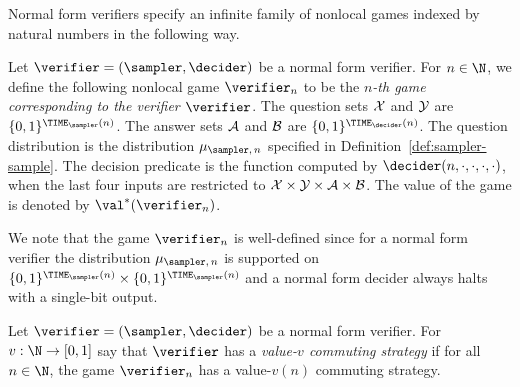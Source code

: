 Normal form verifiers specify an infinite family of nonlocal games indexed by
natural numbers in the following way.

\begin{definition}
  \label{def:normal-game}
  Let $\verifier = (\sampler, \decider)$ be a normal form verifier.
  For $n \in \N$, we define the following nonlocal game $\verifier_{n}$ to be
  the \emph{$n$-th game corresponding to the verifier $\verifier$}.
  The question sets $\cal{X}$ and $\cal{Y}$ are $\{0,1\}^{\TIME_\sampler(n)}$.
  The answer sets $\cal{A}$ and $\cal{B}$ are $\{0,1\}^{\TIME_\decider(n)}$.
  The question distribution is the distribution $\mu_{\sampler,\, n}$ specified
  in Definition~\ref{def:sampler-sample}.
  The decision predicate is the function computed by
  $\decider(n,\cdot,\cdot,\cdot,\cdot)$, when the last four inputs are
  restricted to $\cal{X}\times \cal{Y}\times\cal{A}\times\cal{B}$.
  The value of the game is denoted by $\val^*(\verifier_{n})$.
\end{definition}

We note that the game $\verifier_n$ is well-defined since for a normal form
verifier the distribution $\mu_{\sampler,\, n}$ is supported on
$\{0,1\}^{\TIME_\sampler(n)}\times \{0,1\}^{\TIME_\sampler(n)}$ and a normal
form decider always halts with a single-bit output.

\begin{definition}
  \label{def:comm-with-checker}
  Let $\verifier = (\sampler, \decider)$ be a normal form verifier.
  For $v:\N\to [0,1]$ say that $\verifier$ has a \emph{value-$v$ commuting
    strategy} if for all $n \in \N$, the game $\verifier_n$ has a value-$v(n)$
  commuting strategy.
\end{definition}


 
